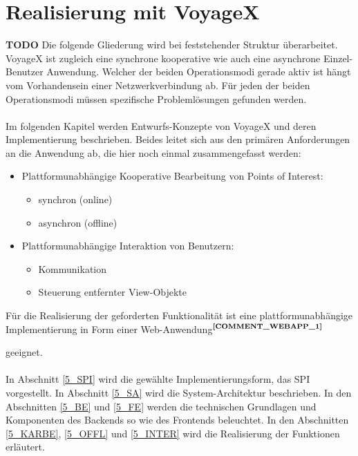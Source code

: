 \newpage

%
%
\section{Realisierung mit VoyageX}

\textbf{TODO} Die folgende Gliederung wird bei feststehender Struktur überarbeitet.\\
\noindent
VoyageX ist zugleich eine synchrone kooperative wie auch eine asynchrone Einzel-Benutzer Anwendung. Welcher der beiden Operationsmodi gerade aktiv ist hängt vom Vorhandensein einer Netzwerkverbindung ab. Für jeden der beiden Operationsmodi müssen spezifische Problemlösungen gefunden werden.\\ \\
Im folgenden Kapitel werden Entwurfs-Konzepte von VoyageX und deren Implementierung beschrieben. Beides leitet sich aus den primären Anforderungen an die Anwendung ab, die hier noch einmal zusammengefasst werden:
	\begin{itemize}
		\item Plattformunabhängige Kooperative Bearbeitung von Points of Interest:
			\begin{itemize}
				\item synchron (online)
				\item asynchron (offline)
			\end{itemize}
		\item Plattformunabhängige Interaktion von Benutzern:
			\begin{itemize}
				\item Kommunikation
				\item Steuerung entfernter View-Objekte
			\end{itemize}
	\end{itemize}
Für die Realisierung der geforderten Funktionalität ist eine plattformunabhängige Implementierung in Form einer Web-Anwendung$^{\textbf{\ref{COMMENT_WEBAPP_1}}}$
\addtocounter{footnote}{1}
geeignet.\\ \\
In Abschnitt \ref{5_SPI} wird die gewählte Implementierungsform, das SPI vorgestellt. In Abschnitt \ref{5_SA} wird die System-Architektur beschrieben. In den Abschnitten \ref{5_BE} und  \ref{5_FE} werden die technischen Grundlagen und Komponenten des Backends so wie des Frontends beleuchtet. In den Abschnitten \ref{5_KARBE}, \ref{5_OFFL} und \ref{5_INTER} wird die Realisierung der Funktionen erläutert.

